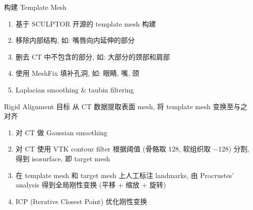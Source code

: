 \documentclass{beamer}
\begin{document}
\begin{frame}{构建 Template Mesh}
  \begin{enumerate}
    \item 基于 SCULPTOR 开源的 template mesh 构建
    \item 移除内部结构, 如: 嘴唇向内延伸的部分
    \item 删去 CT 中不包含的部分, 如: 大部分的颈部和肩部
    \item 使用 MeshFix 填补孔洞, 如: 眼睛, 嘴, 颈
    \item Laplacian smoothing \& taubin filtering
  \end{enumerate}
  \begin{figure}
    \centering
  \end{figure}
\end{frame}

\begin{frame}{Rigid Alignment}
  \textcolor{tsinghua}{目标} 从 CT 数据提取表面 mesh, 将 template mesh 变换至与之对齐
  \begin{enumerate}
    \item 对 CT 做 Gaussian smoothing
    \item 对 CT 使用 VTK contour filter 根据阈值 (骨骼取 \num{128}, 软组织取 \num{-128}) 分割, 得到 isosurface, 即 target mesh
    \item 在 template mesh 和 target mesh 上人工标注 landmarks, 由 Procrustes' analysis 得到全局刚性变换 (平移 + 缩放 + 旋转)
    \item ICP (Iterative Closest Point) 优化刚性变换
  \end{enumerate}
\end{frame}
\end{document}
